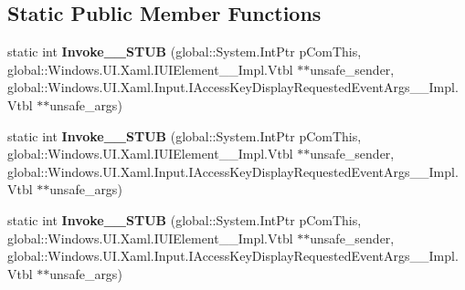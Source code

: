 \subsection*{Static Public Member Functions}
\begin{DoxyCompactItemize}
\item 
\mbox{\label{struct_windows_1_1_foundation_1_1_typed_event_handler___a___windows___u_i___xaml___u_i_element__0a74a57359b62166d706be96094573e6_a4f9fee64af9b879c41860ee2f5505676}} 
static int {\bfseries Invoke\+\_\+\+\_\+\+S\+T\+UB} (global\+::\+System.\+Int\+Ptr p\+Com\+This, global\+::\+Windows.\+U\+I.\+Xaml.\+I\+U\+I\+Element\+\_\+\+\_\+\+Impl.\+Vtbl $\ast$$\ast$unsafe\+\_\+sender, global\+::\+Windows.\+U\+I.\+Xaml.\+Input.\+I\+Access\+Key\+Display\+Requested\+Event\+Args\+\_\+\+\_\+\+Impl.\+Vtbl $\ast$$\ast$unsafe\+\_\+args)
\item 
\mbox{\label{struct_windows_1_1_foundation_1_1_typed_event_handler___a___windows___u_i___xaml___u_i_element__0a74a57359b62166d706be96094573e6_a4f9fee64af9b879c41860ee2f5505676}} 
static int {\bfseries Invoke\+\_\+\+\_\+\+S\+T\+UB} (global\+::\+System.\+Int\+Ptr p\+Com\+This, global\+::\+Windows.\+U\+I.\+Xaml.\+I\+U\+I\+Element\+\_\+\+\_\+\+Impl.\+Vtbl $\ast$$\ast$unsafe\+\_\+sender, global\+::\+Windows.\+U\+I.\+Xaml.\+Input.\+I\+Access\+Key\+Display\+Requested\+Event\+Args\+\_\+\+\_\+\+Impl.\+Vtbl $\ast$$\ast$unsafe\+\_\+args)
\item 
\mbox{\label{struct_windows_1_1_foundation_1_1_typed_event_handler___a___windows___u_i___xaml___u_i_element__0a74a57359b62166d706be96094573e6_a4f9fee64af9b879c41860ee2f5505676}} 
static int {\bfseries Invoke\+\_\+\+\_\+\+S\+T\+UB} (global\+::\+System.\+Int\+Ptr p\+Com\+This, global\+::\+Windows.\+U\+I.\+Xaml.\+I\+U\+I\+Element\+\_\+\+\_\+\+Impl.\+Vtbl $\ast$$\ast$unsafe\+\_\+sender, global\+::\+Windows.\+U\+I.\+Xaml.\+Input.\+I\+Access\+Key\+Display\+Requested\+Event\+Args\+\_\+\+\_\+\+Impl.\+Vtbl $\ast$$\ast$unsafe\+\_\+args)
\item 
\mbox{\label{struct_windows_1_1_foundation_1_1_typed_event_handler___a___windows___u_i___xaml___u_i_element__0a74a57359b62166d706be96094573e6_a4f9fee64af9b879c41860ee2f5505676}} 

\end{DoxyCompactItemize}
